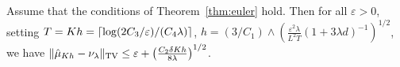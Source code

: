 \begin{cor}
  \label{coro:precision}
  Assume that the conditions of Theorem~\ref{thm:euler} hold. Then for all $\varepsilon >0$, setting
$T = Kh  = \left\lceil \log(2C_3/\varepsilon)/(C_4\lambda) \right\rceil$, %
$h = (3/C_1)\wedge\left(\frac{\varepsilon^2 \lambda}{L^2 T}(1+3\lambda d)^{-1}\right)^{1/2}$, %
  we have
    $\| \hat{\mu}_{Kh} - \nu_\lambda \|_{\textnormal{TV}} \leq \varepsilon + \left(\frac{C_2 \delta K h}{8\lambda}\right)^{1/2} $. 
\end{cor}

